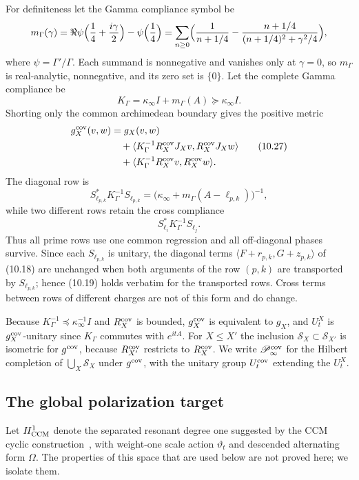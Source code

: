 \documentclass[11pt]{amsart}
\theoremstyle{definition}
\theoremstyle{remark}
\begin{document}
For definiteness let the Gamma compliance symbol be
\[
 m_\Gamma(\gamma)=\Re\psi\Bigl(\frac14+\frac{i\gamma}2\Bigr)-\psi\Bigl(\frac14\Bigr)
 =\sum_{n\ge0}\Bigl(\frac1{n+1/4}-\frac{n+1/4}{(n+1/4)^2+\gamma^2/4}\Bigr),
\]
where \(\psi=\Gamma'/\Gamma\).  Each summand is nonnegative and vanishes
only at \(\gamma=0\), so \(m_\Gamma\) is real-analytic, nonnegative, and
its zero set is \(\{0\}\).  Let the complete Gamma compliance be
\[
 K_\Gamma=\kappa_\infty I+m_\Gamma(A)\succeq\kappa_\infty I.
 \tag{10.26}
\]
Shorting only the common archimedean boundary gives the positive metric
\[
 \begin{aligned}
 g_X^{\rm cov}(v,w)
 &=g_X(v,w)\\
 &\quad+\langle K_\Gamma^{-1}R_X^{\rm cov}J_Xv,
                         R_X^{\rm cov}J_Xw\rangle\\
 &\quad+\langle K_\Gamma^{-1}R_X^{\rm cov}v,
                         R_X^{\rm cov}w\rangle.
 \end{aligned}
 \tag{10.27}
\]
The diagonal row is
\[
 S_{\ell_{p,k}}^*K_\Gamma^{-1}S_{\ell_{p,k}}
 =\bigl(\kappa_\infty+m_\Gamma(A-\ell_{p,k})\bigr)^{-1},
 \tag{10.28}
\]
while two different rows retain the cross compliance
\[
 S_{\ell_i}^*K_\Gamma^{-1}S_{\ell_j}.
 \tag{10.29}
\]
Thus all prime rows use one common regression and all off-diagonal phases
survive.  Since each \(S_{\ell_{p,k}}\) is unitary, the diagonal terms
\(\langle F+r_{p,k},G+z_{p,k}\rangle\) of (10.18) are unchanged when both
arguments of the row \((p,k)\) are transported by \(S_{\ell_{p,k}}\); hence
(10.19) holds verbatim for the transported rows.  Cross terms between rows
of different charges are not of this form and do change.

Because \(K_\Gamma^{-1}\preceq\kappa_\infty^{-1}I\) and \(R_X^{\rm cov}\) is
bounded, \(g_X^{\rm cov}\) is equivalent to \(g_X\), and \(U^X_t\) is
\(g_X^{\rm cov}\)-unitary since \(K_\Gamma\) commutes with \(e^{itA}\).  For
\(X\le X'\) the inclusion \(\mathscr S_X\subset\mathscr S_{X'}\) is isometric
for \(g^{\rm cov}\), because \(R_{X'}^{\rm cov}\) restricts to
\(R_X^{\rm cov}\).  We write \(\mathscr P_\infty^{\rm cov}\) for the Hilbert
completion of \(\bigcup_X\mathscr S_X\) under \(g^{\rm cov}\), with the
unitary group \(U^{\rm cov}_t\) extending the \(U^X_t\).

\subsection{The global polarization target}

Let \(H^1_{\rm CCM}\) denote the separated resonant degree one suggested by
the CCM cyclic construction~\cite{CCM2025}, with weight-one scale action
\(\vartheta_t\) and descended alternating form \(\Omega\).  The properties
of this space that are used below are not proved here; we isolate them.
\end{document}
